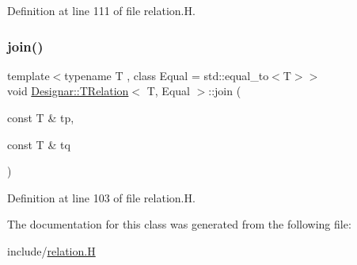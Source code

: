 Definition at line 111 of file relation.\+H.

\mbox{\label{class_designar_1_1_t_relation_a484b21a54f5d2b9862487fbb8b5ac1e7}} 
\subsubsection{\texorpdfstring{join()}{join()}}
{\footnotesize\ttfamily template$<$typename T , class Equal  = std\+::equal\+\_\+to$<$\+T$>$$>$ \\
void \hyperlink{class_designar_1_1_t_relation}{Designar\+::\+T\+Relation}$<$ T, Equal $>$\+::join (\begin{DoxyParamCaption}\item[{const T \&}]{tp,  }\item[{const T \&}]{tq }\end{DoxyParamCaption})\hspace{0.3cm}{\ttfamily [inline]}}



Definition at line 103 of file relation.\+H.



The documentation for this class was generated from the following file\+:\begin{DoxyCompactItemize}
\item 
include/\hyperlink{relation_8_h}{relation.\+H}\end{DoxyCompactItemize}
